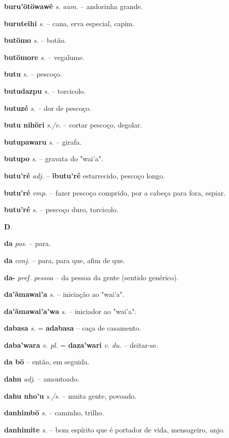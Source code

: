 \textbf{buru'ötöwawẽ} \textit{s. aum.} -- andorinha grande.

\textbf{buruteihi} \textit{s.} -- cana, erva especial, capim.

\textbf{butömo} \textit{s.} -- botão.

\textbf{butömore} \textit{s.} -- vegalume.

\textbf{butu} \textit{s.} -- pescoço.

\textbf{butudazpu} \textit{s.} -- torcicolo.

\textbf{butuzé} \textit{s.} -- dor de pescoço.

\textbf{butu nihöri} \textit{s./v.} -- cortar pescoço, degolar.

\textbf{butupawaru} \textit{s.} -- girafa.

\textbf{butupo} \textit{s.} -- gravata do "wai'a".

\textbf{butu'ré} \textit{adj.} -- \textbf{ĩbutu'ré} estarrecido, pescoço longo.

\textbf{butu'ré} \textit{vmp.} -- fazer pescoço comprido, por a cabeça para fora, espiar.

\textbf{butu'ré} \textit{s.} -- pescoço duro, torcicolo.



\textbf{D}.



\textbf{da} \textit{pos.} -- para.

\textbf{da} \textit{conj.} -- para, para que, afim de que.

\textbf{da-} \textit{pref. pessoa} -- da pessoa  da gente (sentido genérico).

\textbf{da'ãmawai'a} \textit{s.} -- iniciação ao "wai'a".

\textbf{da'ãmawai'a'wa} \textit{s.} -- iniciador ao "wai'a".

\textbf{dabasa} \textit{s.} = \textbf{adabasa} -- caça de casamento.

\textbf{daba'wara} \textit{v. pl.} = \textbf{daza'wari} \textit{v. du.} -- deitar-se.

\textbf{da bö} -- então, em seguida.

\textbf{dahu} \textit{adj.} -- amontoado.

\textbf{dahu nho'u} \textit{s./s.} -- muita gente, povoado.

\textbf{danhimbö} \textit{s.} -- caminho, trilho.

\textbf{danhimite} \textit{s.} -- bom espírito que é portador de vida, mensageiro, anjo.

